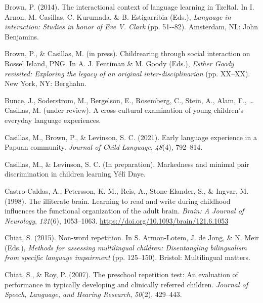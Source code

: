 \documentclass[
  american,
  ,man,floatsintext]{apa6}
\newlength{\cslhangindent}
\newlength{\cslentryspacingunit} %
\newenvironment{CSLReferences}[2] %
 {%
  \setlength{\parindent}{0pt}
  \ifodd #1
  \let\oldpar\par
  \def\par{\hangindent=\cslhangindent\oldpar}
  \fi
  \setlength{\parskip}{#2\cslentryspacingunit}
 }%
 {}
\begin{document}
\begin{CSLReferences}{1}{0}
\leavevmode{}%
Brown, P. (2014). The interactional context of language learning in {T}zeltal. In I. Arnon, M. Casillas, C. Kurumada, \& B. Estigarribia (Eds.), \emph{Language in interaction: Studies in honor of {Eve V. Clark}} (pp. 51-\/-82). Amsterdam, NL: John Benjamins.

\leavevmode{}%
Brown, P., \& Casillas, M. (in press). Childrearing through social interaction on {Rossel Island, PNG}. In A. J. Fentiman \& M. Goody (Eds.), \emph{{Esther Goody} revisited: Exploring the legacy of an original inter-disciplinarian} (pp. XX--XX). New York, NY: Berghahn.

\leavevmode{}%
Bunce, J., Soderstrom, M., Bergelson, E., Rosemberg, C., Stein, A., Alam, F., \ldots{} Casillas, M. (under review). A cross-cultural examination of young children's everyday language experiences.

\leavevmode{}%
Casillas, M., Brown, P., \& Levinson, S. C. (2021). {Early language experience in a Papuan community}. \emph{Journal of Child Language}, \emph{48}(4), 792--814.

\leavevmode{}%
Casillas, M., \& Levinson, S. C. (In preparation). Markedness and minimal pair discrimination in children learning {Yélî Dnye}.

\leavevmode{}%
Castro-Caldas, A., Petersson, K. M., Reis, A., Stone-Elander, S., \& Ingvar, M. (1998). {The illiterate brain. Learning to read and write during childhood influences the functional organization of the adult brain.} \emph{Brain: A Journal of Neurology}, \emph{121}(6), 1053--1063. \url{https://doi.org/10.1093/brain/121.6.1053}

\leavevmode{}%
Chiat, S. (2015). Non-word repetition. In S. Armon-Lotem, J. de Jong, \& N. Meir (Eds.), \emph{Methods for assessing multilingual children: Disentangling bilingualism from specific language impairment} (pp. 125--150). Bristol: Multilingual matters.

\leavevmode{}%
Chiat, S., \& Roy, P. (2007). The preschool repetition test: An evaluation of performance in typically developing and clinically referred children. \emph{Journal of Speech, Language, and Hearing Research}, \emph{50}(2), 429--443.


\end{CSLReferences}
\end{document}
